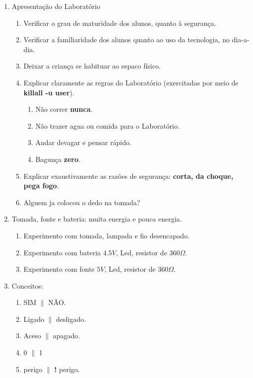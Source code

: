 
\ClearWallPaper %

\normalsize

\begin{enumerate}
	\item Apresentação do Laboratório
	\begin{enumerate}
		\item Verificar o grau de maturidade dos alunos, quanto à segurança.
		\item Verificar a famíliaridade dos alunos quanto ao uso da tecnologia, no dia-a-dia.
		\item Deixar a criança se habituar ao espaco físico.
		\item Explicar claramente as regras do Laboratório (exercitadas por meio de \textbf{killall -u user}).
		\begin{enumerate}
			\item Não correr \textbf{nunca}.
			\item Não trazer agua ou comida para o Laboratório.
			\item Andar devagar e pensar rápido.
			\item Bagunça \textbf{zero}.
		\end{enumerate}
	\item Explicar exaustivamente as razões de segurança: \textbf{corta, da choque, pega fogo}.
	\item Alguem ja colocou o dedo na tomada?
	\end{enumerate}
\item Tomada, fonte e bateria: muita energia e pouca energia.
\begin{enumerate}
	\item Experimento com tomada, lampada e fio desencapado.
	\item Experimento com bateria $4.5V$, Led, resistor de 360$\Omega$.
	\item Experimento com fonte $5V$, Led, resistor de 360$\Omega$.
\end{enumerate}
\item Conceitos:
\begin{enumerate}
	\item SIM $\|$ NÃO.
	\item Ligado $\|$ desligado.
	\item Aceso $\|$ apagado.
	\item 0 $\|$ 1
	\item perigo $\|$ \textbf{!} perigo.
\end{enumerate}
\end{enumerate}

